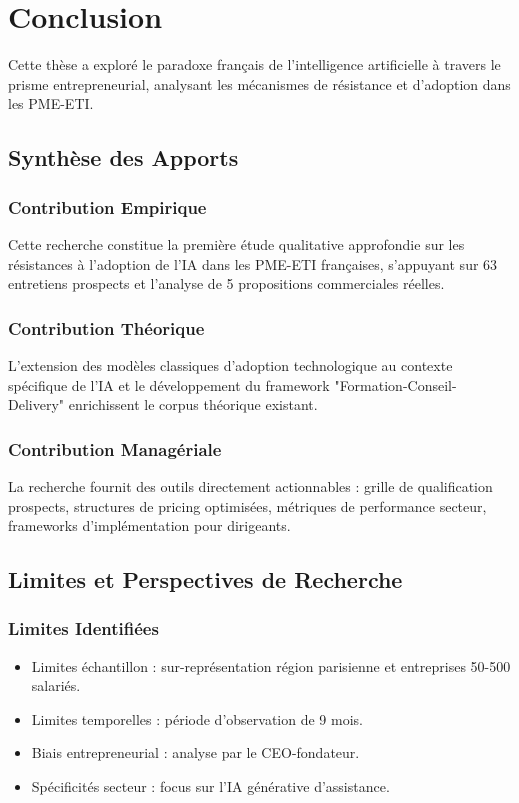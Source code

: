 \chapter{Conclusion}
\label{chap:conclusion}

Cette thèse a exploré le paradoxe français de l'intelligence artificielle à travers le prisme entrepreneurial, analysant les mécanismes de résistance et d'adoption dans les PME-ETI.

\section{Synthèse des Apports}

\subsection{Contribution Empirique}
Cette recherche constitue la première étude qualitative approfondie sur les résistances à l'adoption de l'IA dans les PME-ETI françaises, s'appuyant sur 63 entretiens prospects et l'analyse de 5 propositions commerciales réelles.

\subsection{Contribution Théorique}
L'extension des modèles classiques d'adoption technologique au contexte spécifique de l'IA et le développement du framework "Formation-Conseil-Delivery" enrichissent le corpus théorique existant.

\subsection{Contribution Managériale}
La recherche fournit des outils directement actionnables : grille de qualification prospects, structures de pricing optimisées, métriques de performance secteur, frameworks d'implémentation pour dirigeants.

\section{Limites et Perspectives de Recherche}

\subsection{Limites Identifiées}
\begin{itemize}
    \item Limites échantillon : sur-représentation région parisienne et entreprises 50-500 salariés.
    \item Limites temporelles : période d'observation de 9 mois.
    \item Biais entrepreneurial : analyse par le CEO-fondateur.
    \item Spécificités secteur : focus sur l'IA générative d'assistance.
\end{itemize}

